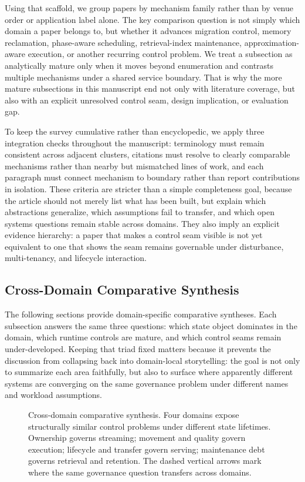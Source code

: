 \documentclass[acmsmall,screen,review]{acmart}
\begin{document}
Using that scaffold, we group papers by mechanism family rather than by venue order or application label alone. The key comparison question is not simply which domain a paper belongs to, but whether it advances migration control, memory reclamation, phase-aware scheduling, retrieval-index maintenance, approximation-aware execution, or another recurring control problem. We treat a subsection as analytically mature only when it moves beyond enumeration and contrasts multiple mechanisms under a shared service boundary. That is why the more mature subsections in this manuscript end not only with literature coverage, but also with an explicit unresolved control seam, design implication, or evaluation gap.

To keep the survey cumulative rather than encyclopedic, we apply three integration checks throughout the manuscript: terminology must remain consistent across adjacent clusters, citations must resolve to clearly comparable mechanisms rather than nearby but mismatched lines of work, and each paragraph must connect mechanism to boundary rather than report contributions in isolation. These criteria are stricter than a simple completeness goal, because the article should not merely list what has been built, but explain which abstractions generalize, which assumptions fail to transfer, and which open systems questions remain stable across domains. They also imply an explicit evidence hierarchy: a paper that makes a control seam visible is not yet equivalent to one that shows the seam remains governable under disturbance, multi-tenancy, and lifecycle interaction.

\subsection{Cross-Domain Comparative Synthesis}

The following sections provide domain-specific comparative syntheses. Each subsection answers the same three questions: which state object dominates in the domain, which runtime controls are mature, and which control seams remain under-developed. Keeping that triad fixed matters because it prevents the discussion from collapsing back into domain-local storytelling: the goal is not only to summarize each area faithfully, but also to surface where apparently different systems are converging on the same governance problem under different names and workload assumptions.

\begin{figure}[t]
\centering
\resizebox{0.96\textwidth}{!}{}
\caption{Cross-domain comparative synthesis. Four domains expose structurally similar control problems under different state lifetimes. Ownership governs streaming; movement and quality govern execution; lifecycle and transfer govern serving; maintenance debt governs retrieval and retention. The dashed vertical arrows mark where the same governance question transfers across domains.}
\label{fig:cross-domain}
\end{figure}
\end{document}
